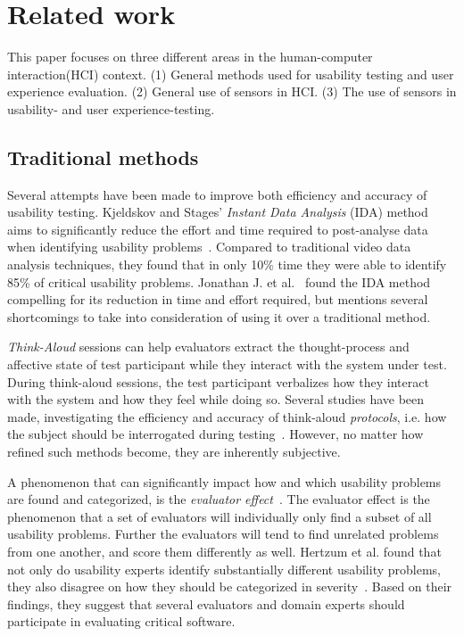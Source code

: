 \section{Related work}
This paper focuses on three different areas in the human-computer interaction(HCI) context. (1) General methods used for usability testing and user experience evaluation. (2) General use of sensors in HCI. (3) The use of sensors in usability- and user experience-testing.

\subsection{Traditional methods} %


Several attempts have been made to improve both efficiency and accuracy of
usability testing. Kjeldskov and Stages' \textit{Instant Data
Analysis} (IDA) method aims to significantly reduce the effort and time required
to post-analyse data when identifying usability
problems~\cite{instant_data_analysis}. Compared to traditional video data
analysis techniques, they found that in only 10\% time they were able to
identify 85\% of critical usability problems. Jonathan J. et
al.~\cite{use_of_TA_and_IDA} found the IDA
method compelling for its reduction in time and effort required, but mentions
several shortcomings to take into consideration of using it over a traditional
method.

\textit{Think-Aloud} sessions can help evaluators extract the thought-process
and affective state of test participant while they interact with the system
under test. During think-aloud sessions, the test participant verbalizes how
they interact with the system and how they feel while doing so.  Several studies
have been made, investigating the efficiency and accuracy of think-aloud
\textit{protocols}, i.e. how the subject should be interrogated during
testing~\cite{two_think_aloud_protocols_study}. However, no matter how refined
such methods become, they are inherently subjective.

A phenomenon that can significantly impact how and which usability problems are
found and categorized, is the \textit{evaluator effect}~\cite{eval_effect}.
The evaluator effect is the phenomenon that a set of evaluators will individually only find a subset of all usability problems.
Further the evaluators will tend to find unrelated problems from one another, and score them differently as well.\cite{eval_effect}
Hertzum et al. found that not only do
usability experts identify substantially different usability problems, they also
disagree on how they should be categorized in
severity~\cite{eval_effect_research}. Based on their findings, they suggest that
several evaluators and domain experts should participate in evaluating critical
software.

